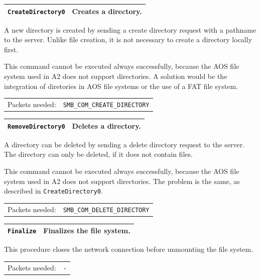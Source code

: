 \documentclass[11pt,a4paper]{book}
\begin{document}
\begin{center}
\renewcommand{\tabcolsep}{5mm}
\begin{tabular}{p{3cm}p{8cm}}
\texttt{CreateDirectory0} & \textbf{Creates a directory.} \\ 
\hline
\end{tabular}
\end{center}
A new directory is created by sending a create directory request with a pathname to the server. Unlike file creation, it is not necessary to create a directory locally first.

This command cannot be executed always successfully, because the AOS file system used in A2 does not support directories. A solution would be the integration of diretories in AOS file systems or the use of a FAT file system. \\
\renewcommand{\tabcolsep}{5mm}
\begin{tabular}{p{3cm}p{8cm}}
Packets needed: & \texttt{SMB\_COM\_CREATE\_DIRECTORY} \\
\end{tabular}

\begin{center}
\renewcommand{\tabcolsep}{5mm}
\begin{tabular}{p{3cm}p{8cm}}
\texttt{RemoveDirectory0} & \textbf{Deletes a directory.} \\ 
\hline
\end{tabular}
\end{center}
A directory can be deleted by sending a delete directory request to the server. The directory can only be deleted, if it does not contain files.

This command cannot be executed always successfully, because the AOS file system used in A2 does not support directories. The problem is the same, as described in \texttt{CreateDirectory0}. \\
\renewcommand{\tabcolsep}{5mm}
\begin{tabular}{p{3cm}p{8cm}}
Packets needed: & \texttt{SMB\_COM\_DELETE\_DIRECTORY} \\
\end{tabular}

\begin{center}
\renewcommand{\tabcolsep}{5mm}
\begin{tabular}{p{3cm}p{8cm}}
\texttt{Finalize} & \textbf{Finalizes the file system.} \\ 
\hline
\end{tabular}
\end{center}
This procedure closes the network connection before unmounting the file system. \\
\renewcommand{\tabcolsep}{5mm}
\begin{tabular}{p{3cm}p{8cm}}
Packets needed: & \texttt{-} \\
\end{tabular}
\end{document}
